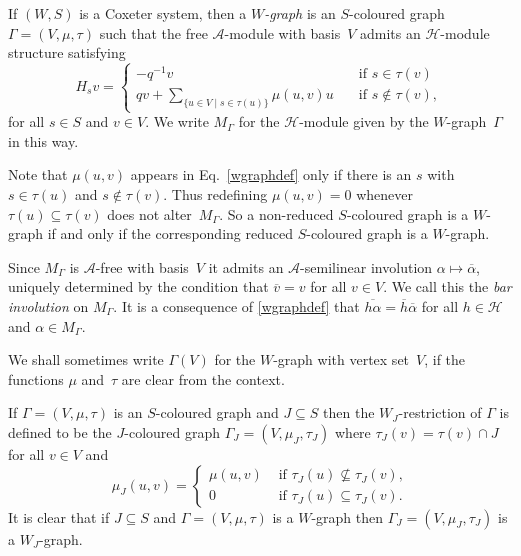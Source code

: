 \documentclass[ALCO,ThmDefs,Unicode,epreuves]{cedram}
\begin{document}
If $(W,S)$ is a Coxeter system, then a \emph{$W\!$-graph} is
an $S$-coloured graph $\Gamma=(V, \mu, \tau)$ such that the free
$\mathcal{A}$-module with basis~$V$ admits an $\mathcal{H}$-module
structure satisfying
\begin{equation}\label{wgraphdef}
 H_{s}v = \begin{cases}
 -q^{-1}v \quad &\text{if $s \in \tau(v)$}\\
 qv + \sum_{\{u \in V \mid s \in \tau(u)\}}\mu(u,v)u
 \quad &\text{if $s \notin \tau(v)$},
 \end{cases}
\end{equation}
for all $s \in S$ and $v \in V\!$.
We write $M_\Gamma$ for the $\mathcal{H}$-module given by
the $W\!$-graph~$\Gamma$ in this way.

Note that $\mu(u,v)$ appears in Eq.~\eqref{wgraphdef} only if there is an $s$
with $s\in\tau(u)$ and $s\notin\tau(v)$. Thus redefining $\mu(u,v)=0$
whenever $\tau(u)\subseteq \tau(v)$ does not alter~$M_\Gamma$.
So a non-reduced $S$-coloured graph is a $W$-graph if and only if the
corresponding reduced $S$-coloured graph is a $W$-graph.

Since $M_\Gamma$
is $\mathcal{A}$-free with basis~$V$ it admits an
$\mathcal{A}$-semilinear involution $\alpha \mapsto \overline{\alpha}$,
uniquely determined by the condition
that $\overline v=v$ for all $v\in V$. We call this the
\emph{bar involution} on $M_\Gamma$. It is a consequence of
\eqref{wgraphdef} that $\overline{h\alpha}=\overline{h}\overline{\alpha}$
for all $h\in \mathcal{H}$ and $\alpha \in M_\Gamma$.

We shall sometimes write $\Gamma(V)$ for the $W\!$-graph with vertex
set~$V\!$, if the functions $\mu$ and~$\tau$ are clear from the context.

If $\Gamma=(V,\mu,\tau)$ is an $S$-coloured graph and $J\subseteq S$ then
the $W_J$-restriction of $\Gamma$ is defined to be the $J$-coloured graph
$\Gamma_{J} = (V,\mu_J,\tau_J)$
where $\tau_J(v)=\tau(v)\cap J$ for all $v\in V$ and
\[
\mu_J(u,v)=
\begin{cases}
\mu(u,v)&\text{ if $\tau_J(u)\nsubseteq \tau_J(v)$,}\\
0&\text{ if $\tau_J(u)\subseteq \tau_J(v)$.}
\end{cases}
\]
It is clear that if $J\subseteq S$ and $\Gamma=(V,\mu,\tau)$ is a
$W\!$-graph then $\Gamma_J=(V,\mu_J,\tau_J)$ is a $W_J$-graph.
\end{document}
